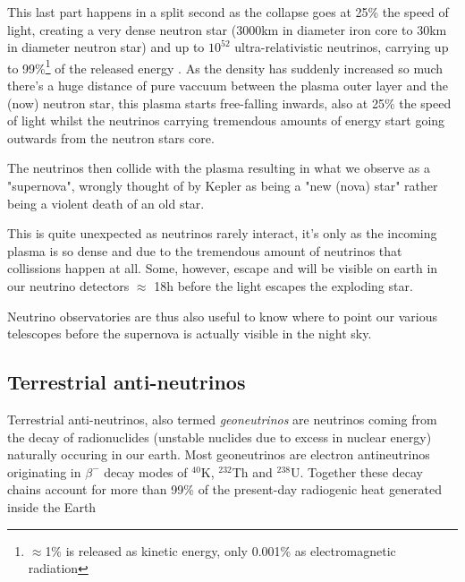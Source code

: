 \documentclass[11pt,a4paper,faculty=we,language=en,doctype=report]{cls/ugent-doc}
\begin{document}
This last part happens in a split second as the collapse goes at 25\% the speed
of light, creating a very dense neutron star (3000km in diameter iron core to
30km in diameter neutron star) and up to $10^{52}$ ultra-relativistic
neutrinos, carrying up to 99\%\footnote{$\approx$1\% is released as kinetic energy, only 0.001\% as
electromagnetic radiation} of the released energy
\cite{Melson_2015}. As the density has suddenly increased so much
there's a huge distance of pure vaccuum between the plasma outer layer and the
(now) neutron star, this plasma starts free-falling inwards, also at 25\% the
speed of light whilst the neutrinos carrying tremendous amounts of energy start
going outwards from the neutron stars core.

The neutrinos then collide with the plasma resulting in what we observe as a
"supernova", wrongly thought of by Kepler as being a "new (nova) star" rather
being a violent death of an old star.

This is quite unexpected as neutrinos rarely interact, it's only as the
incoming plasma is so dense and due to the tremendous amount of neutrinos that
collissions happen at all. Some, however, escape and will be visible on earth
in our neutrino detectors $\approx$ 18h before the light escapes the exploding
star.

Neutrino observatories are thus also useful to know where to point our various
telescopes before the supernova is actually visible in the night sky.
\subsection{Terrestrial anti-neutrinos}
Terrestrial anti-neutrinos, also termed \textit{geoneutrinos} are neutrinos
coming from the decay of radionuclides (unstable nuclides due to excess in
nuclear energy) naturally occuring in our earth.  Most geoneutrinos are
electron antineutrinos originating in $\beta^-$ decay modes of ${}^{40}$K,
${}^{232}$Th and ${}^{238}$U. Together these decay chains account for more than
99\% of the present-day radiogenic heat generated inside the Earth
\end{document}
